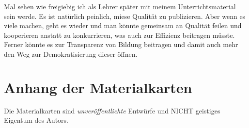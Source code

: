 Mal sehen wie freigiebig ich als Lehrer später mit meinem Unterrichtsmaterial sein werde. Es ist natürlich peinlich, miese Qualität zu publizieren. Aber wenn es viele machen, geht es wieder und man könnte gemeinsam an Qualität feilen und kooperieren anstatt zu konkurrieren, was auch zur Effizienz beitragen müsste. Ferner könnte es zur Transparenz von Bildung beitragen und damit auch mehr den Weg zur Demokratisierung dieser öffnen. 










\section{Anhang der Materialkarten}
Die Materialkarten sind \emph{unveröffentlichte} Entwürfe und NICHT geistiges Eigentum des Autors. 



\clearpage
\newpage


